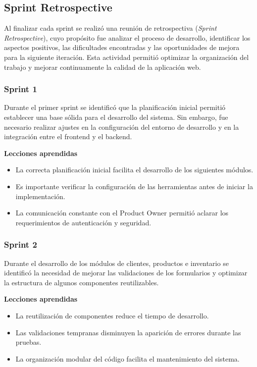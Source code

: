 \subsection{Sprint Retrospective}

Al finalizar cada sprint se realizó una reunión de retrospectiva (\textit{Sprint Retrospective}), cuyo propósito fue analizar el proceso de desarrollo, identificar los aspectos positivos, las dificultades encontradas y las oportunidades de mejora para la siguiente iteración. Esta actividad permitió optimizar la organización del trabajo y mejorar continuamente la calidad de la aplicación web.

\subsubsection*{Sprint 1}

Durante el primer sprint se identificó que la planificación inicial permitió establecer una base sólida para el desarrollo del sistema. Sin embargo, fue necesario realizar ajustes en la configuración del entorno de desarrollo y en la integración entre el frontend y el backend.

\textbf{Lecciones aprendidas}

\begin{itemize}
    \item La correcta planificación inicial facilita el desarrollo de los siguientes módulos.
    \item Es importante verificar la configuración de las herramientas antes de iniciar la implementación.
    \item La comunicación constante con el Product Owner permitió aclarar los requerimientos de autenticación y seguridad.
\end{itemize}

\vspace{0.5cm}

\subsubsection*{Sprint 2}

Durante el desarrollo de los módulos de clientes, productos e inventario se identificó la necesidad de mejorar las validaciones de los formularios y optimizar la estructura de algunos componentes reutilizables.

\textbf{Lecciones aprendidas}

\begin{itemize}
    \item La reutilización de componentes reduce el tiempo de desarrollo.
    \item Las validaciones tempranas disminuyen la aparición de errores durante las pruebas.
    \item La organización modular del código facilita el mantenimiento del sistema.
\end{itemize}

